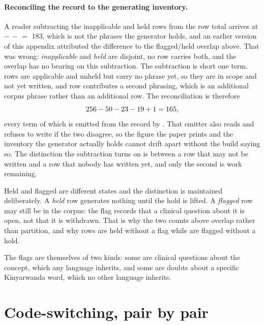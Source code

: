 \paragraph{Reconciling the record to the generating inventory.} A reader
subtracting the inapplicable and held rows from the row total arrives at
\CorpusRows{} $-$ \CorpusInapplicable{} $-$ \CorpusHeld{} $=$ 183, which is not
the \CorpusInventory{} phrases the generator holds, and an earlier version of
this appendix attributed the difference to the flagged/held overlap above. That
was wrong: \emph{inapplicable} and \emph{held} are disjoint, no row carries
both, and the overlap has no bearing on this subtraction. The subtraction is
short one term. \CorpusUnauthored{} rows are applicable and unheld but carry no
phrase yet, so they are in scope and not yet written, and \CorpusSecondPhrasings{}
row contributes a second phrasing, which is an additional corpus phrase rather
than an additional row. The reconciliation is therefore
%
\[ 256{} - 50{} - 23{} - 19{}
   + 1{} = 165{}, \]
%
every term of which is emitted from the record by
. That emitter also reads
 and refuses to write if the two disagree, so the
figure the paper prints and the inventory the generator actually holds cannot
drift apart without the build saying so. The distinction the subtraction turns
on is between a row that may not be written and a row that nobody has written
yet, and only the second is work remaining.

Held and flagged are different states and the distinction is maintained
deliberately. A \emph{held} row generates nothing until the hold is lifted. A
\emph{flagged} row may still be in the corpus: the flag records that a clinical
question about it is open, not that it is withdrawn. That is why the two counts
above overlap rather than partition, and why \CorpusHeldOnly{} rows are held
without a flag while \CorpusFlaggedOnly{} are flagged without a hold.

The flags are themselves of two kinds: some are clinical questions about the
concept, which any language inherits, and some are doubts about a specific
Kinyarwanda word, which no other language inherits.


\section{Code-switching, pair by pair}
\label{app:codeswitch}


